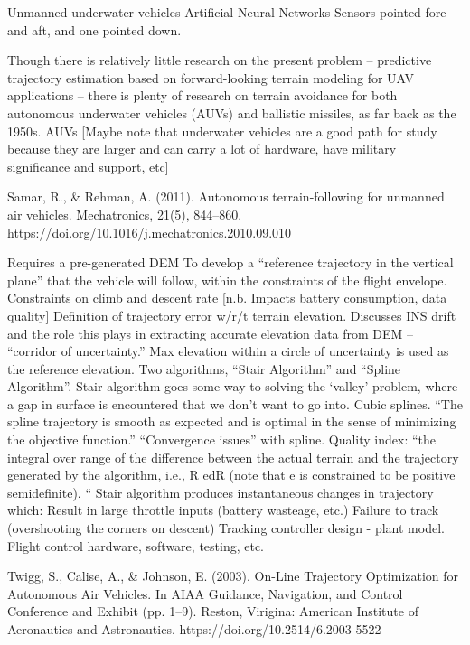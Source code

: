 \documentclass[10pt]{article}
\begin{document}
Unmanned underwater vehicles
Artificial Neural Networks
Sensors pointed fore and aft, and one pointed down.

Though there is relatively little research on the present problem -- predictive trajectory estimation based on forward-looking terrain modeling for UAV applications -- there is plenty of research on terrain avoidance for both autonomous underwater vehicles (AUVs) and ballistic missiles, as far back as the 1950s. 
AUVs
[Maybe note that underwater vehicles are a good path for study because they are larger and can carry a lot of hardware, have military significance and support, etc]

\cite{Samar2011}
Samar, R., \& Rehman, A. (2011). Autonomous terrain-following for unmanned air vehicles. Mechatronics, 21(5), 844–860. https://doi.org/10.1016/j.mechatronics.2010.09.010

Requires a pre-generated DEM
To develop a “reference trajectory in the vertical plane” that the vehicle will follow, within the constraints of the flight envelope.
Constraints on climb and descent rate [n.b. Impacts battery consumption, data quality]
Definition of trajectory error w/r/t terrain elevation.
Discusses INS drift and the role this plays in extracting accurate elevation data from DEM -- “corridor of uncertainty.”
Max elevation within a circle of uncertainty is used as the reference elevation.
Two algorithms, “Stair Algorithm” and “Spline Algorithm”.
Stair algorithm goes some way to solving the ‘valley’ problem, where a gap in surface is encountered that we don’t want to go into.
Cubic splines.
“The spline trajectory is smooth as expected and is optimal in the sense of minimizing the objective function.”
“Convergence issues” with spline.
Quality index: “the integral over range of the difference between the actual terrain and the trajectory generated by the algorithm, i.e., R edR (note that e is constrained to be positive semidefinite). “
Stair algorithm produces instantaneous changes in trajectory which:
Result in large throttle inputs (battery wasteage, etc.)
Failure to track (overshooting the corners on descent)
Tracking controller design - plant model.
Flight control hardware, software, testing, etc.

\cite{Twigg2003}
Twigg, S., Calise, A., \& Johnson, E. (2003). On-Line Trajectory Optimization for Autonomous Air Vehicles. In AIAA Guidance, Navigation, and Control Conference and Exhibit (pp. 1–9). Reston, Virigina: American Institute of Aeronautics and Astronautics. https://doi.org/10.2514/6.2003-5522
\end{document}
